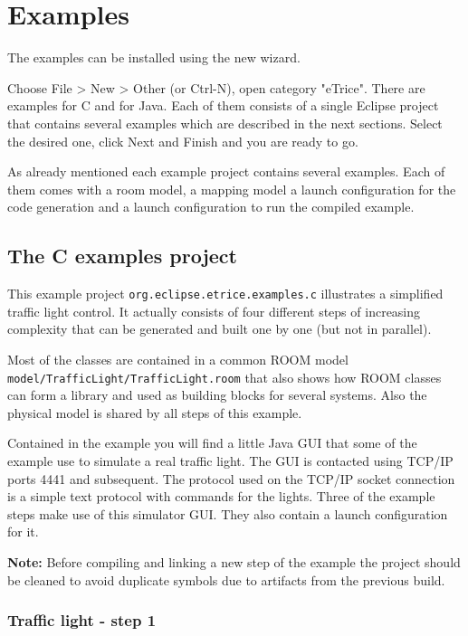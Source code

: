 \chapter{Examples}

The \eTrice{} examples can be installed using the new wizard.

Choose File > New > Other (or Ctrl-N), open category "eTrice".
There are examples for C and for Java. Each of them consists of a single
Eclipse project that contains several examples which are described
in the next sections.
Select the desired one, click Next and Finish and you are ready to go.

As already mentioned each example project contains several examples.
Each of them comes with a room model, a mapping model a launch configuration
for the code generation and a launch configuration to run the compiled example.

\section{The C examples project}

This example project \texttt{org.eclipse.etrice.examples.c} illustrates
a simplified traffic light control.
It actually consists of four different steps of increasing
complexity that can be generated and
built one by one (but not in parallel).

Most of the classes are contained in a common ROOM model
\texttt{model/TrafficLight/TrafficLight.room} that also shows
how ROOM classes can form a library and used as building blocks for several systems.
Also the physical model is shared by all steps of this example.

Contained in the example you will find a little Java GUI that some of the
example use to simulate a real traffic light. The GUI is contacted
using TCP/IP ports 4441 and subsequent. The protocol used on the TCP/IP
socket connection is a simple text protocol with commands for the lights.
Three of the example steps make use of this simulator GUI. They
also contain a launch configuration for it.

\textbf{Note:} Before compiling and linking a new step of the example
the project should be cleaned to avoid duplicate symbols due to
artifacts from the previous build.

\subsection{Traffic light - step 1}

